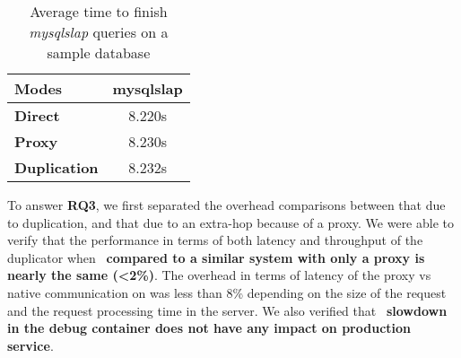 \begin{table*}
	\centering
\begin{center}
	\begin{tabular}{l c}
	\toprule
	\textbf{Modes} & \textbf{mysqlslap}\\
	\midrule
	\textbf{Direct} & 8.220s \\
	\textbf{Proxy} & 8.230s \\
	\textbf{Duplication} & 8.232s \\
	\bottomrule
	\end{tabular}
\end{center}
\caption{Average time to finish \emph{mysqlslap} queries on a sample database}
\label{tab:mysqlslap}
\end{table*}   

\begin{comment}
\noindent \textbf{\underline{Throughput}}\\ 
To check the impact on application throughput, we looked at \emph{httperf}~\cite{httperf},  	
\end{comment}

\begin{tcolorbox}
	To answer \textbf{RQ3}, we first separated the overhead comparisons between that due to duplication, and that due to an extra-hop because of a proxy. We were able to verify that the performance in terms of both latency and throughput of the duplicator when ~\textbf{compared to a similar system with only a proxy is nearly the same (\textless 2\%)}. The overhead in terms of latency of the proxy vs native communication on was less than 8\% depending on the size of the request and the request processing time in the server. We also verified that ~\textbf{slowdown in the debug container does not have any impact on production service}. 
\end{tcolorbox}